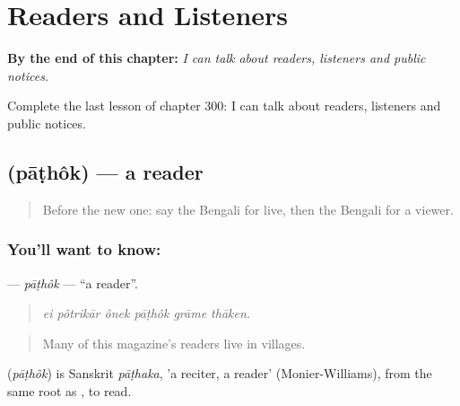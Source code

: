 
\chapter{Readers and Listeners}
\label{ch:bn-readers-and-listeners}

\begin{chapteropening}
\textbf{By the end of this chapter:} \emph{I can talk about readers, listeners and public notices.}

Complete the last lesson of chapter 300: I can talk about readers, listeners and public notices.
\end{chapteropening}

\section[\texorpdfstring{\bn{পাঠক} (pāṭhôk)}{পাঠক (pāṭhôk)}]{ (pāṭhôk) — a reader}

\label{lesson:BN-C300-pathok}



\begin{quote}
Before the new one: say the Bengali for live, then the Bengali for a viewer.
\end{quote}

\subsection*{You'll want to know: }
\textbf{} — \emph{pāṭhôk} — \textquotedblleft{}a reader\textquotedblright{}.

\begin{quote}
     
\end{quote}

\begin{quote}
\emph{ei pôtrikār ônek pāṭhôk grāme thāken.}
\end{quote}

\begin{quote}
Many of this magazine's readers live in villages.
\end{quote}

\begin{cousinweb}
\textbf{} (\emph{pāṭhôk}) is Sanskrit \emph{pāṭhaka}, 'a reciter, a reader' (Monier-Williams), from the same root as \textbf{}, to read.
\end{cousinweb}

